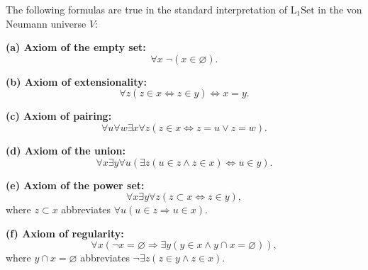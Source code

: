 The following formulas are true in the standard interpretation of $\mathrm{L}_1\mathrm{Set}$ in the von Neumann universe $V$:

\textbf{(a) Axiom of the empty set:}
$$\forall x \; \neg (x \in \varnothing).$$

\textbf{(b) Axiom of extensionality:}
$$\forall z (z \in x \Leftrightarrow z \in y) \Leftrightarrow x = y.$$

\textbf{(c) Axiom of pairing:}
$$\forall u \forall w \exists x \forall z (z \in x \Leftrightarrow z = u \vee z = w).$$

\textbf{(d) Axiom of the union:}
$$\forall x \exists y \forall u (\exists z (u \in z \wedge z \in x) \Leftrightarrow u \in y).$$

\textbf{(e) Axiom of the power set:}
$$\forall x \exists y \forall z (z \subset x \Leftrightarrow z \in y),$$
where $z \subset x$ abbreviates $\forall u (u \in z \Rightarrow u \in x)$.

\textbf{(f) Axiom of regularity:}
$$\forall x (\neg x = \varnothing \Rightarrow \exists y (y \in x \wedge y \cap x = \varnothing)),$$
where $y \cap x = \varnothing$ abbreviates $\neg \exists z (z \in y \wedge z \in x)$.
